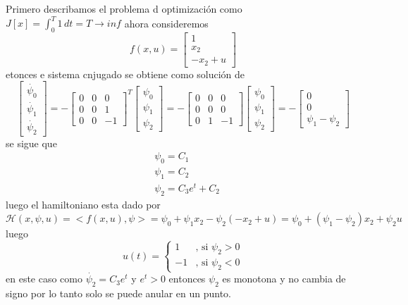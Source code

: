 \documentclass{ejercicios}
\begin{document}
\begin{solution}
  Primero describamos el problema d optimización como $J[x] = \int_{0}^{T}1\,dt = T\to inf$ ahora consideremos 
  \[f(x,u) = \begin{bmatrix}1 \\ x_2 \\ -x_2 + u\end{bmatrix}\]
  etonces e sistema cnjugado se obtiene como solución de 
  \[
  \begin{bmatrix}\dot{\psi_0} \\ \dot{\psi_1} \\ \dot{\psi_2}\end{bmatrix}
  = - \begin{bmatrix}
    0 & 0 & 0 \\ 
    0 & 0 & 1 \\ 
    0 & 0 & -1 
  \end{bmatrix}^T 
  \begin{bmatrix}
    \psi_0 \\ \psi_1 \\ \psi_2 
  \end{bmatrix} = - 
  \begin{bmatrix}
    0 & 0 & 0 \\ 
    0 & 0 & 0 \\ 
    0 & 1 & -1 
  \end{bmatrix}
  \begin{bmatrix}
    \psi_0 \\ \psi_1 \\ \psi_2 
  \end{bmatrix} = - 
  \begin{bmatrix}0 \\ 0 \\ \psi_1 - \psi_2\end{bmatrix}
  \]
  se sigue que 
  \[
    \begin{aligned}
      & \psi_0 = C_1 \\ 
      & \psi_1 = C_2 \\ 
      & \psi_2 = C_3e^{t} + C_2 
    \end{aligned}
    \]
    luego el hamiltoniano esta dado por $\mathcal{H}(x,\psi,u) = <f(x,u),\psi> = \psi_0 + \psi_1x_2 - \psi_2(-x_2 + u) = \psi_0 + (\psi_1 - \psi_2)x_2 + \psi_2u$
    luego \[u(t) = \begin{cases} 1 & \text{, si }\psi_2 > 0 \\ -1 & \text{, si }\psi_2 < 0\end{cases}\]
    en este caso como $\dot{\psi_2} = C_3e^{t}$ y $e^{t} > 0 $ entonces $\psi_2$ es monotona y no cambia de signo por lo tanto solo se puede anular en un punto.

\end{solution}
\end{document}
